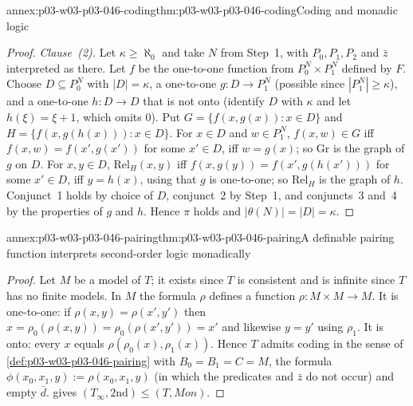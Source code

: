 \begin{annexitem}{annex:p03-w03-p03-046-coding}{thm:p03-w03-p03-046-coding}{Coding and monadic logic}
\begin{proof}
\emph{Clause~(2).} Let \(\kappa\ge\aleph_0\) and take \(N\) from Step~1,
with \(P_0,P_1,P_2\) and \(\bar z\) interpreted as there. Let \(f\) be the
one-to-one function from \(P_0^N\times P_1^N\) defined by \(F\). Choose
\(D\subseteq P_0^N\) with \(|D|=\kappa\), a one-to-one
\(g\colon D\to P_1^N\) (possible since \(|P_1^N|\ge\kappa\)), and a
one-to-one \(h\colon D\to D\) that is not onto (identify \(D\) with
\(\kappa\) and let \(h(\xi)=\xi+1\), which omits \(0\)). Put
\(G=\{f(x,g(x)):x\in D\}\) and \(H=\{f(x,g(h(x))):x\in D\}\). For \(x\in D\)
and \(w\in P_1^N\), \(f(x,w)\in G\) iff \(f(x,w)=f(x',g(x'))\) for some
\(x'\in D\), iff \(w=g(x)\); so \(\mathrm{Gr}\) is the graph of \(g\) on
\(D\). For \(x,y\in D\), \(\mathrm{Rel}_H(x,y)\) iff
\(f(x,g(y))=f(x',g(h(x')))\) for some \(x'\in D\), iff \(y=h(x)\), using
that \(g\) is one-to-one; so \(\mathrm{Rel}_H\) is the graph of \(h\).
Conjunct~1 holds by choice of \(D\), conjunct~2 by Step~1, and conjuncts~3
and~4 by the properties of \(g\) and \(h\). Hence \(\pi\) holds and
\(|\theta(N)|=|D|=\kappa\).
\end{proof}
\end{annexitem}

\begin{annexitem}{annex:p03-w03-p03-046-pairing}{thm:p03-w03-p03-046-pairing}{A definable pairing function interprets second-order logic monadically}
\begin{proof}
Let \(M\) be a model of \(T\); it exists since \(T\) is consistent and is
infinite since \(T\) has no finite models. In \(M\) the formula \(\rho\)
defines a function \(\rho\colon M\times M\to M\). It is one-to-one: if
\(\rho(x,y)=\rho(x',y')\) then \(x=\rho_0(\rho(x,y))=\rho_0(\rho(x',y'))=x'\)
and likewise \(y=y'\) using \(\rho_1\). It is onto: every \(x\) equals
\(\rho(\rho_0(x),\rho_1(x))\). Hence \(T\) admits coding in the sense of
\cref{def:p03-w03-p03-046-pairing} with \(B_0=B_1=C=M\), the formula
\(\phi(x_0,x_1,y):=\rho(x_0,x_1,y)\) (in which the predicates and \(\bar z\)
do not occur) and empty \(\bar d\).  gives
\((T_\infty,\mathrm{2nd})\le(T,\mathit{Mon})\).
\end{proof}
\end{annexitem}

